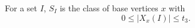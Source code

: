 \begin{definition}
For a set \(I\), \(S_I\) is the class of base vertices \(x\) with
\[
0\le |X_x(I)|\le t_3.
\]
\end{definition}
